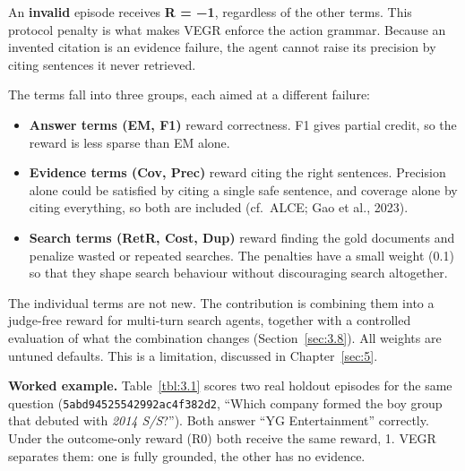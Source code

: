 An \textbf{invalid} episode receives \textbf{R = −1}, regardless of the
other terms. This protocol penalty is what makes VEGR enforce the action
grammar. Because an invented citation is an evidence failure, the agent
cannot raise its precision by citing sentences it never retrieved.

The terms fall into three groups, each aimed at a different failure:

\begin{itemize}
\tightlist
\item
  \textbf{Answer terms (EM, F1)} reward correctness. F1 gives partial
  credit, so the reward is less sparse than EM alone.
\item
  \textbf{Evidence terms (Cov, Prec)} reward citing the right sentences.
  Precision alone could be satisfied by citing a single safe sentence,
  and coverage alone by citing everything, so both are included
  (cf.~ALCE; Gao et al., 2023).
\item
  \textbf{Search terms (RetR, Cost, Dup)} reward finding the gold
  documents and penalize wasted or repeated searches. The penalties have
  a small weight (0.1) so that they shape search behaviour without
  discouraging search altogether.
\end{itemize}

The individual terms are not new. The contribution is combining them
into a judge-free reward for multi-turn search agents, together with a
controlled evaluation of what the combination changes
(Section~\ref{sec:3.8}). All weights are untuned defaults. This is a
limitation, discussed in Chapter~\ref{sec:5}.

\textbf{Worked example.} Table~\ref{tbl:3.1} scores two real holdout
episodes for the same question
(\texttt{5abd\allowbreak{}9452\allowbreak{}5542\allowbreak{}992a\allowbreak{}c4f3\allowbreak{}82d2\allowbreak{}},
``Which company formed the boy group that debuted with \emph{2014
S/S}?''). Both answer ``YG Entertainment'' correctly. Under the
outcome-only reward (R0) both receive the same reward, 1. VEGR separates
them: one is fully grounded, the other has no evidence.

